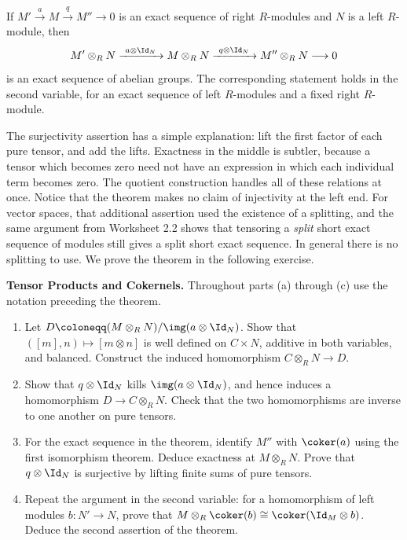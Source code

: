 \documentclass[12pt,reqno]{amsart}
\begin{document}
\begin{theorem}
If $M'\xrightarrow{a}M\xrightarrow{q}M''\to0$ is an exact sequence of right $R$-modules and $N$ is a left $R$-module, then
\[
M'\otimes_RN\xrightarrow{\ a\otimes\Id_N\ }M\otimes_RN\xrightarrow{\ q\otimes\Id_N\ }M''\otimes_RN\longrightarrow0
\]
is an exact sequence of abelian groups. The corresponding statement holds in the second variable, for an exact sequence of left $R$-modules and a fixed right $R$-module.
\end{theorem}

The surjectivity assertion has a simple explanation: lift the first factor of each pure tensor, and add the lifts. Exactness in the middle is subtler, because a tensor which becomes zero need not have an expression in which each individual term becomes zero. The quotient construction handles all of these relations at once. Notice that the theorem makes no claim of injectivity at the left end. For vector spaces, that additional assertion used the existence of a splitting, and the same argument from Worksheet 2.2 shows that tensoring a \emph{split} short exact sequence of modules still gives a split short exact sequence. In general there is no splitting to use. We prove the theorem in the following exercise.

\hrulefill

\begin{problems}
\item\label{t:rightexact} \textbf{Tensor Products and Cokernels.} Throughout parts (a) through (c) use the notation preceding the theorem.
\begin{enumerate}
\item Let $D\coloneqq(M\otimes_RN)/\img(a\otimes\Id_N)$. Show that $([m],n)\mapsto[m\otimes n]$ is well defined on $C\times N$, additive in both variables, and balanced. Construct the induced homomorphism $C\otimes_RN\to D$.
\item Show that $q\otimes\Id_N$ kills $\img(a\otimes\Id_N)$, and hence induces a homomorphism $D\to C\otimes_RN$. Check that the two homomorphisms are inverse to one another on pure tensors.
\item For the exact sequence in the theorem, identify $M''$ with $\coker(a)$ using the first isomorphism theorem. Deduce exactness at $M\otimes_RN$. Prove that $q\otimes\Id_N$ is surjective by lifting finite sums of pure tensors.
\item Repeat the argument in the second variable: for a homomorphism of left modules $b:N'\to N$, prove that $M\otimes_R\coker(b)\cong\coker(\Id_M\otimes b)$. Deduce the second assertion of the theorem.
\end{enumerate}
\end{problems}
\end{document}
